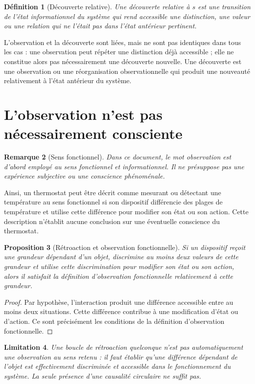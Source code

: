 \documentclass[11pt,a4paper,openany]{book}
\newtheorem{definition}{Définition}[chapter]
\newtheorem{proposition}[definition]{Proposition}
\newtheorem{remark}[definition]{Remarque}
\newtheorem{limitation}[definition]{Limitation}
\begin{document}
\begin{definition}[Découverte relative]
Une découverte relative à $s$ est une transition de l'état informationnel du système qui rend accessible une distinction, une valeur ou une relation qui ne l'était pas dans l'état antérieur pertinent.
\end{definition}

L'observation et la découverte sont liées, mais ne sont pas identiques dans tous les cas : une observation peut répéter une distinction déjà accessible ; elle ne constitue alors pas nécessairement une découverte nouvelle. Une découverte est une observation ou une réorganisation observationnelle qui produit une nouveauté relativement à l'état antérieur du système.

\section{L'observation n'est pas nécessairement consciente}
\begin{remark}[Sens fonctionnel]
Dans ce document, le mot observation est d'abord employé au sens fonctionnel et informationnel. Il ne présuppose pas une expérience subjective ou une conscience phénoménale.
\end{remark}

Ainsi, un thermostat peut être décrit comme mesurant ou détectant une température au sens fonctionnel si son dispositif différencie des plages de température et utilise cette différence pour modifier son état ou son action. Cette description n'établit aucune conclusion sur une éventuelle conscience du thermostat.

\begin{proposition}[Rétroaction et observation fonctionnelle]
Si un dispositif reçoit une grandeur dépendant d'un objet, discrimine au moins deux valeurs de cette grandeur et utilise cette discrimination pour modifier son état ou son action, alors il satisfait la définition d'observation fonctionnelle relativement à cette grandeur.
\end{proposition}
\begin{proof}
Par hypothèse, l'interaction produit une différence accessible entre au moins deux situations. Cette différence contribue à une modification d'état ou d'action. Ce sont précisément les conditions de la définition d'observation fonctionnelle.\end{proof}

\begin{limitation}
Une boucle de rétroaction quelconque n'est pas automatiquement une observation au sens retenu : il faut établir qu'une différence dépendant de l'objet est effectivement discriminée et accessible dans le fonctionnement du système. La seule présence d'une causalité circulaire ne suffit pas.
\end{limitation}
\end{document}
